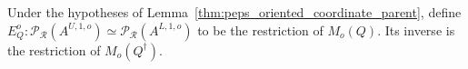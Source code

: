 \begin{definition}%
    \label{def:peps_oriented_coordinate_parent_equivalence}
    \leanok
    Under the hypotheses of
    Lemma~\ref{thm:peps_oriented_coordinate_parent}, define
    $E_Q^o:\mathcal P_{\mathcal R}(A^{U,1,o})
        \simeq\mathcal P_{\mathcal R}(A^{L,1,o})$ to be the restriction
    of $M_o(Q)$. Its inverse is the restriction of $M_o(Q^\dagger)$.
\end{definition}
